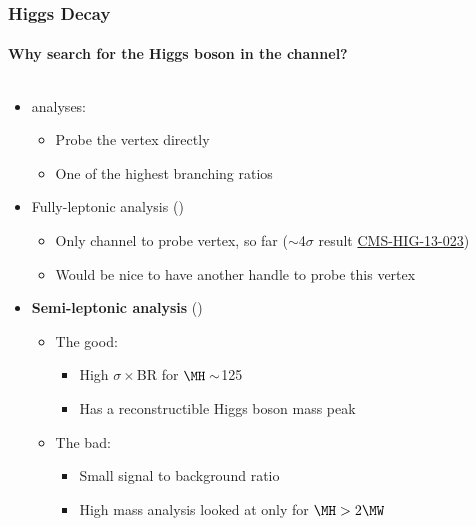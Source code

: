 \begin{frame}
	\setlength{\leftmargini}{0.5cm}
	\setlength{\leftmarginii}{0.5cm}
	\setlength{\leftmarginiii}{0.5cm}
	\frametitle{Higgs Decay}
	\framesubtitle{\small Why search for the Higgs boson in the \HWWlvjj channel?}
	\vspace*{-0.24cm}	
	\begin{columns}[T]
			\vspace*{-0.25cm}
			\begin{block}{}
				\begin{itemize}
					\item \HWW analyses:
					\begin{itemize}
						\item Probe the \HWW vertex directly
						\item One of the highest branching ratios
					\end{itemize}
					\item Fully-leptonic analysis (\HWWlvlv)
					\begin{itemize}
						\item Only channel to probe vertex, so far ($\sim$4$\sigma$ result \href{https://arxiv.org/pdf/1312.1129.pdf}{CMS-HIG-13-023})
						\item Would be nice to have another handle to probe this vertex
					\end{itemize}
					\item \textbf{Semi-leptonic analysis} (\HWWlvjj)
					\begin{itemize}
						\item The good:
						\begin{itemize}
							\item High $\sigma\times$BR for $\MH\sim$125\GeV
							\item Has a reconstructible Higgs boson mass peak
						\end{itemize}
						\item The bad:
						\begin{itemize}
							\item Small signal to background ratio
							\item High mass analysis looked at only for $\MH>\text{2}\MW$
						\end{itemize}

\end{itemize}
\end{itemize}
\end{block}
\end{columns}
\end{frame}
